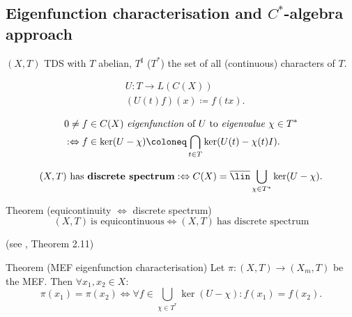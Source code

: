\subsection{Eigenfunction characterisation and $C^*$-algebra approach}
\begin{frame}
  $(X,T)$ TDS with $T$ abelian, $T^\sharp$ ($T^*$) the set of all (continuous) characters of $T$.
\begin{definition}
  \begin{equation*}
    \begin{split}
      &U : T \longrightarrow L(C(X)) \\
      &(U(t) f)(x) \coloneq f(tx).
    \end{split}
  \end{equation*}
   \end{definition}
   \pause
   \begin{definition}
   \begin{equation*}
    \begin{split}
      &0 \neq f \in C(X) \ \text{\emph{eigenfunction} of} \ U \ \text{to \emph{eigenvalue}} \ \chi \in T^*   \\
 &:\Leftrightarrow f \in \ker (U-\chi)\coloneq \bigcap_{t \in T} \ker (U(t)- \chi (t)I).
    \end{split}
      \end{equation*}
   \end{definition}
\end{frame}
\begin{frame}[fragile]
 \begin{definition}
  \begin{equation*}
    (X,T) \ \text{has \textbf{discrete spectrum}}:\Leftrightarrow C(X) = \overline{\lin} \bigcup_{\chi \in T^*} \ker (U- \chi).
  \end{equation*}
\end{definition}
\pause 
  \begin{alertblock}{Theorem (equicontinuity $\Leftrightarrow$ discrete spectrum)}%
  \begin{equation*}
    (X,T) \ \text{is equicontinuous} \Leftrightarrow (X,T) \ \text{has discrete spectrum}
  \end{equation*}

    \hfill(see \cite{HK2023}, Theorem 2.11)
\end{alertblock}
\pause
  \begin{alertblock}{Theorem (MEF eigenfunction characterisation)}
  \label{thm:MEF_EFchar}
  Let $\pi : (X,T) \to (X_m,T)$ be the MEF.
  Then $\forall x_1, x_2 \in X$:
  \begin{equation*}
  \pi (x_1) = \pi (x_2) \Leftrightarrow 
    \forall f \in \bigcup_{\chi \in T^*} \ker (U- \chi) : f(x_1) = f(x_2).
  \end{equation*}
\end{alertblock}
\end{frame}
